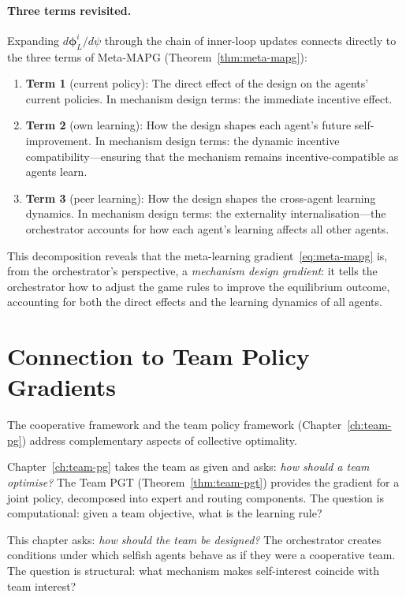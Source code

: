 \paragraph{Three terms revisited.} Expanding $d\bm{\phi}_L^i/d\psi$ through the chain of inner-loop updates connects directly to the three terms of Meta-MAPG (Theorem~\ref{thm:meta-mapg}):
\begin{enumerate}[label=(\roman*)]
  \item \textbf{Term 1} (current policy): The direct effect of the design on the agents' current policies. In mechanism design terms: the immediate incentive effect.
  \item \textbf{Term 2} (own learning): How the design shapes each agent's future self-improvement. In mechanism design terms: the dynamic incentive compatibility---ensuring that the mechanism remains incentive-compatible as agents learn.
  \item \textbf{Term 3} (peer learning): How the design shapes the cross-agent learning dynamics. In mechanism design terms: the externality internalisation---the orchestrator accounts for how each agent's learning affects all other agents.
\end{enumerate}

This decomposition reveals that the meta-learning gradient~\eqref{eq:meta-mapg} is, from the orchestrator's perspective, a \emph{mechanism design gradient}: it tells the orchestrator how to adjust the game rules to improve the equilibrium outcome, accounting for both the direct effects and the learning dynamics of all agents.

\section{Connection to Team Policy Gradients}
\label{sec:team-connection}

The cooperative framework and the team policy framework (Chapter~\ref{ch:team-pg}) address complementary aspects of collective optimality.

Chapter~\ref{ch:team-pg} takes the team as given and asks: \emph{how should a team optimise?} The Team PGT (Theorem~\ref{thm:team-pgt}) provides the gradient for a joint policy, decomposed into expert and routing components. The question is computational: given a team objective, what is the learning rule?

This chapter asks: \emph{how should the team be designed?} The orchestrator creates conditions under which selfish agents behave as if they were a cooperative team. The question is structural: what mechanism makes self-interest coincide with team interest?

